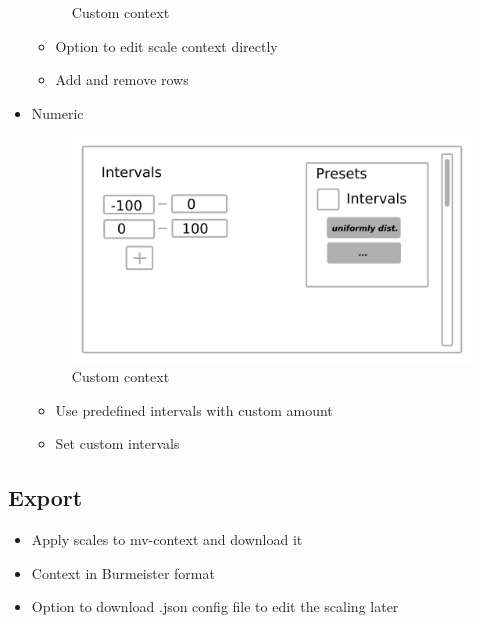 \documentclass[]{article}
\begin{document}
\begin{itemize}
\begin{figure}[H]
			\caption{Custom context}
			\label{fig:o2}
		\end{figure}
		\begin{itemize}
			\item Option to edit scale context directly
			\item Add and remove rows
		\end{itemize}
	\item Numeric
		\begin{figure}[H]
			\includegraphics[width=\linewidth]{num.png}
			\caption{Custom context}
			\label{fig:n1}
		\end{figure}
	    \begin{itemize}
	    	\item Use predefined intervals with custom amount
	    	\item Set custom intervals
	    \end{itemize}
\end{itemize}

\subsection{Export}
	\begin{itemize}
		\item Apply scales to mv-context and download it
		\item Context in Burmeister format
		\item Option to download .json config file to edit the scaling later
	\end{itemize}
\end{document}
